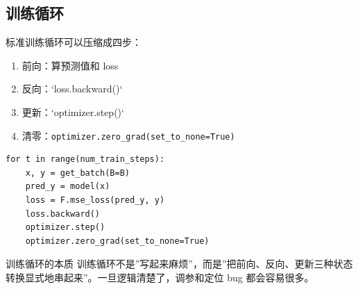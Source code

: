\subsection{训练循环}

标准训练循环可以压缩成四步：

\begin{enumerate}
    \item 前向：算预测值和 loss
    \item 反向：`loss.backward()`
    \item 更新：`optimizer.step()`
    \item 清零：\texttt{optimizer.zero\_grad(set\_to\_none=True)}
\end{enumerate}

\begin{lstlisting}
for t in range(num_train_steps):
    x, y = get_batch(B=B)
    pred_y = model(x)
    loss = F.mse_loss(pred_y, y)
    loss.backward()
    optimizer.step()
    optimizer.zero_grad(set_to_none=True)
\end{lstlisting}

\begin{importantbox}{训练循环的本质}
训练循环不是”写起来麻烦”，而是”把前向、反向、更新三种状态转换显式地串起来”。一旦逻辑清楚了，调参和定位 bug 都会容易很多。
\end{importantbox}

